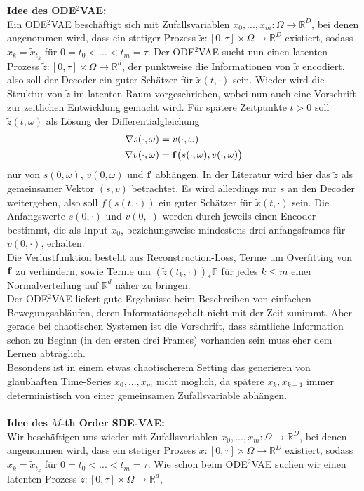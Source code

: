 \documentclass[12pt]{article}
\newcommand{\R}{\mathbb{R}}
\newcommand{\tx}{\widetilde{x}}
\newcommand{\tz}{\widetilde{z}}
\newcommand{\bP}{\mathbb{P}}
\newcommand{\bbf}{\bold{f}}
\begin{document}
	\newpage\noindent
	\textbf{Idee des ODE$^2$VAE:}\\
	Ein ODE$^2$VAE beschäftigt sich mit Zufallsvariablen $x_0,...,x_m : \Omega \rightarrow \R^D$, bei denen angenommen wird, dass ein stetiger Prozess $\tx : [0,\tau] \times \Omega \rightarrow \R^D$ existiert, sodass $x_k = \tx_{t_k}$ für $0=t_0<...<t_m=\tau$. Der ODE$^2$VAE sucht nun einen latenten Prozess $\tz: [0,\tau] \times \Omega \rightarrow \R^d$, der punktweise die Informationen von $\tx$ encodiert, also soll der Decoder ein guter Schätzer für $\tx(t,\cdot)$ sein. Wieder wird die Struktur von $\tz$ im latenten Raum vorgeschrieben, wobei nun auch eine Vorschrift zur zeitlichen Entwicklung gemacht wird. Für spätere Zeitpunkte $t>0$ soll $\tz(t,\omega)$ als Lösung der Differentialgleichung
	\begin{align*}
	\nabla s(\cdot,\omega) &= v(\cdot,\omega)\\
	\nabla v(\cdot,\omega) &= \bbf\big(s(\cdot,\omega),v(\cdot,\omega)\big)
	\end{align*}
	nur von $s(0,\omega)$, $v(0,\omega)$ und $\bbf$ abhängen. In der Literatur wird hier das $\tz$ als gemeinsamer Vektor $(s,v)$ betrachtet. Es wird allerdings nur $s$ an den Decoder weitergeben, also soll
	 $f(s(t,\cdot))$ ein guter Schätzer für $\tx(t,\cdot)$ sein. Die Anfangswerte $s(0,\cdot)$ und $v(0,\cdot)$ werden durch jeweils einen Encoder bestimmt, die als Input $x_0$, beziehungsweise mindestens drei anfangsframes für $v(0,\cdot)$, erhalten.\\
	Die Verlustfunktion besteht aus Reconstruction-Loss, Terme um Overfitting von $\bbf$ zu verhindern, sowie Terme um $(\tz(t_k,\cdot))_*\bP$ für jedes $k \leq m$ einer Normalverteilung auf $\R^d$ näher zu bringen.\\
	Der ODE$^2$VAE liefert gute Ergebnisse beim Beschreiben von einfachen Bewegungsabläufen, deren Informationsgehalt nicht mit der Zeit zunimmt. Aber gerade bei chaotischen Systemen ist die Vorschrift, dass sämtliche Information schon zu Beginn (in den ersten drei Frames) vorhanden sein muss eher dem Lernen abträglich.\\
	Besonders ist in einem etwas chaotischerem Setting das generieren von glaubhaften Time-Series $x_0,...,x_m$ nicht möglich, da spätere $x_k, x_{k+1}$ immer deterministisch von einer gemeinsamen Zufallsvariable abhängen.\\
	\\
	\textbf{Idee des $M$-th Order SDE-VAE:}\\
	Wir beschäftigen uns wieder mit Zufallsvariablen $x_0,...,x_m : \Omega \rightarrow \R^D$, bei denen angenommen wird, dass ein stetiger Prozess $\tx : [0,\tau] \times \Omega \rightarrow \R^D$ existiert, sodass $x_k = \tx_{t_k}$ für $0=t_0<...<t_m=\tau$. Wie schon beim ODE$^2$VAE suchen wir einen latenten Prozess $\tz: [0,\tau] \times \Omega \rightarrow \R^d$,
	
\end{document}
